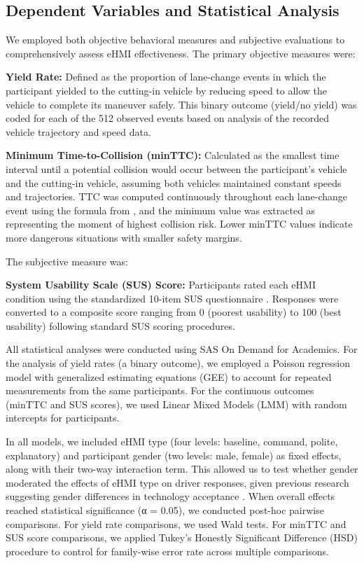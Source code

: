 \documentclass[manuscript,review]{acmart}
\begin{document}
\subsection{Dependent Variables and Statistical Analysis}

We employed both objective behavioral measures and subjective evaluations to comprehensively assess eHMI effectiveness. The primary objective measures were:

\textbf{Yield Rate:} Defined as the proportion of lane-change events in which the participant yielded to the cutting-in vehicle by reducing speed to allow the vehicle to complete its maneuver safely. This binary outcome (yield/no yield) was coded for each of the 512 observed events based on analysis of the recorded vehicle trajectory and speed data.

\textbf{Minimum Time-to-Collision (minTTC):} Calculated as the smallest time interval until a potential collision would occur between the participant's vehicle and the cutting-in vehicle, assuming both vehicles maintained constant speeds and trajectories. TTC was computed continuously throughout each lane-change event using the formula from \cite{hwang2022autonomous}, and the minimum value was extracted as representing the moment of highest collision risk. Lower minTTC values indicate more dangerous situations with smaller safety margins.

The subjective measure was:

\textbf{System Usability Scale (SUS) Score:} Participants rated each eHMI condition using the standardized 10-item SUS questionnaire \cite{brooke1996sus}. Responses were converted to a composite score ranging from 0 (poorest usability) to 100 (best usability) following standard SUS scoring procedures.

All statistical analyses were conducted using SAS On Demand for Academics. For the analysis of yield rates (a binary outcome), we employed a Poisson regression model with generalized estimating equations (GEE) \cite{liang1986longitudinal} to account for repeated measurements from the same participants. For the continuous outcomes (minTTC and SUS scores), we used Linear Mixed Models (LMM) with random intercepts for participants.

In all models, we included eHMI type (four levels: baseline, command, polite, explanatory) and participant gender (two levels: male, female) as fixed effects, along with their two-way interaction term. This allowed us to test whether gender moderated the effects of eHMI type on driver responses, given previous research suggesting gender differences in technology acceptance \cite{venkatesh2000why}. When overall effects reached statistical significance (α = 0.05), we conducted post-hoc pairwise comparisons. For yield rate comparisons, we used Wald tests. For minTTC and SUS score comparisons, we applied Tukey's Honestly Significant Difference (HSD) procedure to control for family-wise error rate across multiple comparisons.
\end{document}
